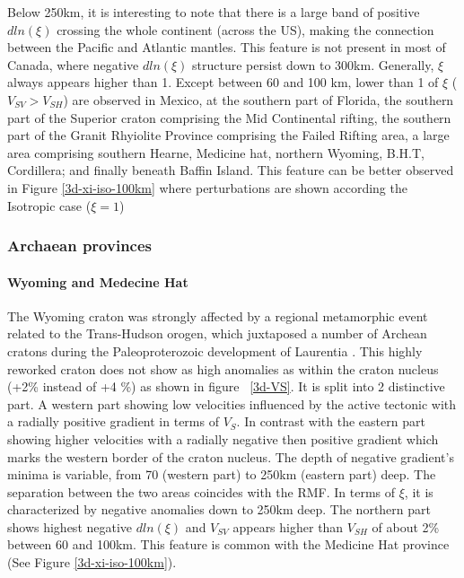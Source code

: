 \documentclass[12pt]{article}
\begin{document}
		Below 250km, it is interesting to note that there is a large band of positive $dln(\xi)$ crossing the whole continent (across the US), making the connection between the Pacific and Atlantic mantles. 
		This feature is not present in most of Canada, where negative $dln(\xi)$ structure persist down to 300km.
		Generally, $\xi$ always appears higher than 1. 
		Except between 60 and 100 km, lower than 1 of $\xi$ ($V_{SV} > V_{SH}$) are observed in Mexico, at the southern part of Florida, the southern part of the Superior craton comprising the Mid Continental rifting, the southern part of the Granit Rhyiolite Province comprising the Failed Rifting area, a large area comprising southern Hearne, Medicine hat, northern Wyoming, B.H.T, Cordillera; and finally beneath Baffin Island. This feature can be better observed in Figure \ref{3d-xi-iso-100km} where perturbations are shown according the Isotropic case ($\xi = 1$)


	\subsubsection{Archaean provinces}

		\paragraph{Wyoming and Medecine Hat}
			The Wyoming craton was strongly affected by a regional metamorphic event related to the Trans-Hudson orogen, which juxtaposed a number of Archean cratons during the Paleoproterozoic development of Laurentia \citep{hoffman1989precambrian}.
			This highly reworked craton does not show as high anomalies as within the craton nucleus (+2\% instead of +4 \:\%) as shown in figure ~\ref{3d-VS}. 
			It is split into 2 distinctive part. A western part showing low velocities influenced by the active tectonic with a radially positive gradient in terms of $V_S$. 
			In contrast with the eastern part showing higher velocities with a radially negative then positive gradient which marks the western border of the craton nucleus. 
			The depth of negative gradient's minima is variable, from 70 (western part) to 250km (eastern part) deep. 
			The separation between the two areas coincides with the RMF.
			In terms of $\xi$, it is characterized by negative anomalies down to 250km deep. 
			The northern part shows highest negative $dln(\xi)$ and $V_{SV}$ appears higher than $V_{SH}$ of about 2\% between 60 and 100km. This feature is common with the Medicine Hat province (See Figure \ref{3d-xi-iso-100km}).
\end{document}
